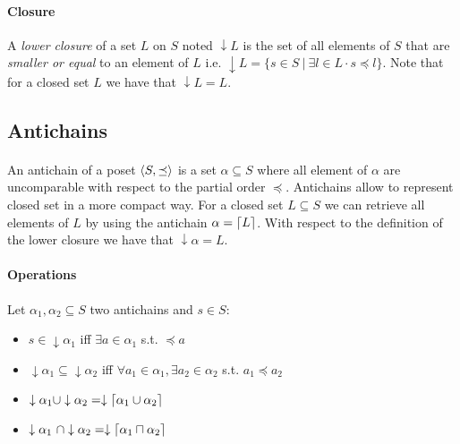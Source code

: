 \documentclass[letterpaper]{memoir}
\DeclarePairedDelimiter{\ceil}{\lceil}{\rceil}
\DeclarePairedDelimiter{\tuple}{\langle}{\rangle}
\begin{document}
\paragraph{Closure} A \textit{lower closure} of a set $L$ on $S$
noted $\downarrow L$ is the set of all elements of $S$ that are
\textit{smaller or equal} to an element of $L$ i.e.
$\downarrow L = \{ s \in S \ | \ \exists l \in L \cdot s \preceq l\}$.
Note that for a closed set $L$ we have that $\downarrow L = L$.


\subsection{Antichains}

\paragraph{}

An antichain of a poset $\tuple{S, \preceq}$
is a set $\alpha \subseteq S$ where all element of $\alpha$
are uncomparable with respect to the partial order $\preceq$.
Antichains allow to represent closed set in a more compact way.
For a closed set $L \subseteq S$ we can retrieve all elements of $L$ by using
the antichain $\alpha = \ceil{L}$. With respect
to the definition of the lower closure we have that $\downarrow \alpha = L$.

\paragraph{Operations}

Let $\alpha_1, \alpha_2 \subseteq S$ two antichains and $s \in S$:

\begin{itemize}
    \item $s \in \downarrow \alpha_1$
    iff $\exists a \in \alpha_1$ s.t. $\preceq a$
    \item $\downarrow \alpha_1 \subseteq \downarrow \alpha_2$
    iff $\forall a_1 \in \alpha_1,
    \exists a_2 \in \alpha_2$ s.t. $a_1 \preceq a_2$
    \item $ \downarrow \alpha_1 \cup \downarrow \alpha_2 =
    \downarrow \ceil{\alpha_1 \cup \alpha_2}$
    \item $\downarrow \alpha_1 \ \cap \downarrow \alpha_2 =
    \downarrow \ceil{\alpha_1 \sqcap \alpha_2}$
\end{itemize}

%
%
\end{document}
